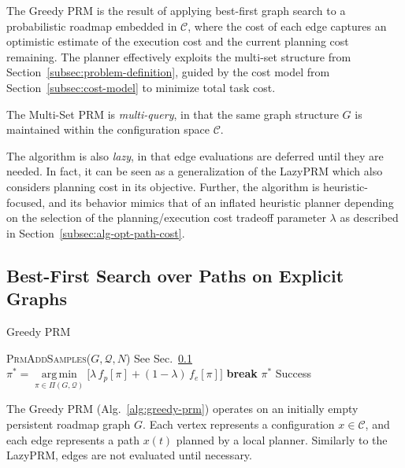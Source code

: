 \documentclass{report}
\DeclareMathOperator*{\argmin}{arg\,min}
\begin{document}
The Greedy PRM is the result of applying
best-first graph search to
a probabilistic roadmap \cite{kavrakietal1996prm}
embedded in $\mathcal{C}$,
where the cost of each edge captures an optimistic estimate of
the execution cost and the current planning cost remaining.
The planner effectively exploits the multi-set structure
from Section~\ref{subsec:problem-definition},
guided by the cost model from Section~\ref{subsec:cost-model}
to minimize total task cost.

The Multi-Set PRM is \emph{multi-query},
in that the same graph
structure $G$ is maintained within the configuration space
$\mathcal{C}$.

The algorithm is also \emph{lazy},
in that edge evaluations are deferred until they are needed.
In fact, it can be seen as a generalization of the
LazyPRM \cite{bohlin2000lazyprm}
which also considers planning cost in its objective.
Further,
the algorithm is heuristic-focused,
and its behavior mimics that of an inflated heuristic planner
depending on the selection of the planning/execution cost
tradeoff parameter $\lambda$
as described in Section~\ref{subsec:alg-opt-path-cost}.

\subsection{Best-First Search over Paths on Explicit Graphs}
\label{subsec:alg-greedy-prm}

\begin{algorithm}
\caption{Greedy PRM}
\label{alg:greedy-prm}
\begin{algorithmic}[1]
\Loop
   \State \textsc{PrmAddSamples}($G, \mathcal{Q}, N$)
      \Comment See Sec.~\ref{subsec:alg-greedy-prm}
   \Loop
         \label{line:best-first-start}
      \State $\pi^* = \argmin\limits_{\pi \in \Pi(G,\mathcal{Q})}
         \big[ \lambda \, f_p[\pi] + (1 - \lambda) \, f_e[\pi] \big]$
         \label{line:select-optimistic-path}
        \State \textbf{break}
      \EndIf
         \State \Return $\pi^*$
            \Comment Success
      \EndIf
   \EndLoop
      \label{line:best-first-end}
\EndLoop
\EndProcedure
\end{algorithmic}
\end{algorithm}

The Greedy PRM (Alg.~\ref{alg:greedy-prm})
operates on an initially empty persistent roadmap graph $G$.
Each vertex represents a configuration $x \in \mathcal{C}$,
and each edge represents a path $x(t)$ planned by a local planner.
Similarly to the LazyPRM,
edges are not evaluated until necessary.
\end{document}
